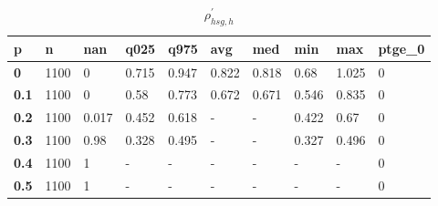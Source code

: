 \begin{table}[h]
 \centering 
\footnotesize
\caption{$\rho_{hsg,h}^\prime $}
\label{tab:alphahsgh}
\begin{tabular}[h]{|l|l|l|l|l|l|l|l|l|l|
    } \hline
\textbf{ p} & \textbf{ n} & \textbf{ nan} & \textbf{ q025} & \textbf{ q975} & \textbf{ avg} & \textbf{ med} & \textbf{ min} & \textbf{ max} & \textbf{ ptge\_0}
    \\ \hline
  \textbf{  0} & 1100 &     0 & 0.715 & 0.947 & 0.822 & 0.818 &  0.68 & 1.025 & 0
    \\ \hline
  \textbf{0.1} & 1100 &     0 &  0.58 & 0.773 & 0.672 & 0.671 & 0.546 & 0.835 & 0
    \\ \hline
  \textbf{0.2} & 1100 & 0.017 & 0.452 & 0.618 & - & - & 0.422 &  0.67 & 0
    \\ \hline
  \textbf{0.3} & 1100 &  0.98 & 0.328 & 0.495 & - & - & 0.327 & 0.496 & 0
    \\ \hline
  \textbf{0.4} & 1100 &     1 & - & - & - & - & - & - & 0
    \\ \hline
  \textbf{0.5} & 1100 &     1 & - & - & - & - & - & - & 0
    \\ \hline
 \end{tabular}
 \end{table}
